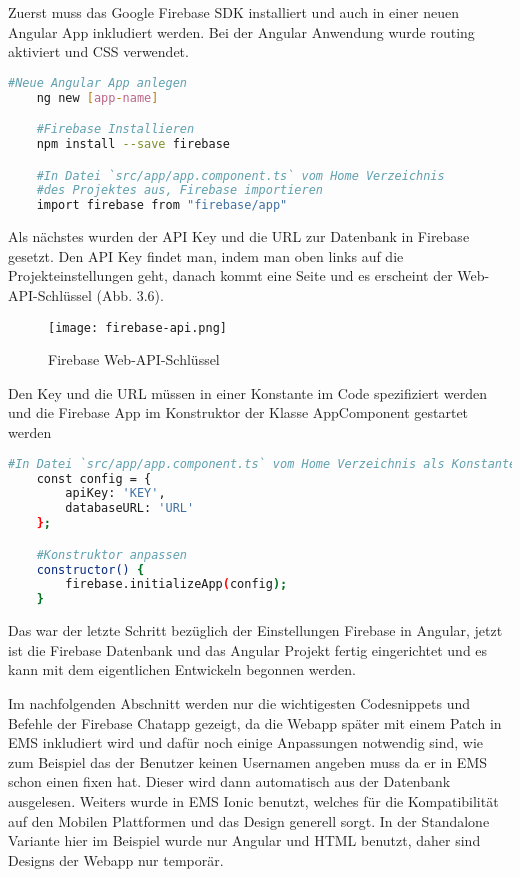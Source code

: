 Zuerst muss das Google Firebase SDK installiert und auch in einer neuen Angular App inkludiert werden. Bei der Angular Anwendung wurde routing aktiviert und CSS verwendet.
\begin{lstlisting}[language=bash]
    #Neue Angular App anlegen
    ng new [app-name]

    #Firebase Installieren
    npm install --save firebase

    #In Datei `src/app/app.component.ts` vom Home Verzeichnis 
    #des Projektes aus, Firebase importieren
    import firebase from "firebase/app"
\end{lstlisting}

Als nächstes wurden der API Key und die URL zur Datenbank in Firebase gesetzt. Den API Key findet man, indem man oben links auf die Projekteinstellungen geht, danach kommt eine Seite und es erscheint der Web-API-Schlüssel (Abb. 3.6).
\begin{center}
    \begin{figure}[H]
        \centering
        \texttt{[image: firebase-api.png]}
        \caption{Firebase Web-API-Schlüssel}
    \end{figure}
\end{center}
Den Key und die URL müssen in einer Konstante im Code spezifiziert werden und die Firebase App im Konstruktor der Klasse AppComponent gestartet werden
\begin{lstlisting}[language=bash]
    #In Datei `src/app/app.component.ts` vom Home Verzeichnis als Konstante zu definieren
    const config = {
        apiKey: 'KEY',
        databaseURL: 'URL'
    };

    #Konstruktor anpassen
    constructor() {
        firebase.initializeApp(config);
    }
\end{lstlisting}
Das war der letzte Schritt bezüglich der Einstellungen Firebase in Angular, jetzt ist die Firebase Datenbank und das Angular Projekt fertig eingerichtet und es kann mit dem eigentlichen Entwickeln begonnen werden.

Im nachfolgenden Abschnitt werden nur die wichtigesten Codesnippets und Befehle der Firebase Chatapp gezeigt, da die Webapp später mit einem Patch in EMS inkludiert wird und dafür noch einige Anpassungen notwendig sind,
wie zum Beispiel das der Benutzer keinen Usernamen angeben muss da er in EMS schon einen fixen hat. Dieser wird dann automatisch aus der Datenbank ausgelesen. Weiters wurde in EMS Ionic benutzt, welches für die 
Kompatibilität auf den Mobilen Plattformen und das Design generell sorgt. In der Standalone Variante hier im Beispiel wurde nur Angular und HTML benutzt, daher sind Designs der Webapp nur temporär.

